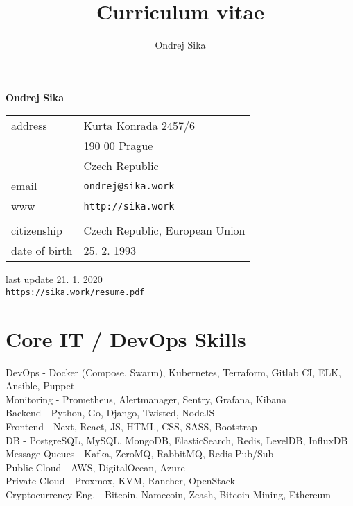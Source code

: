\documentclass[12pt,a4paper]{article}
\title{Curriculum vitae}
\author{Ondrej Sika}
\begin{document}
\begin{center}
{\LARGE \bf Ondrej Sika}\\
\vspace*{0.2cm}
\begin{tabular}{R{7cm}L{7cm}}
address & Kurta Konrada 2457/6\\
 & 190 00 Prague\\
 & Czech Republic\\
email & \texttt{ondrej@sika.work}\\
www & \texttt{http://sika.work}\\
\\
citizenship & Czech Republic, European Union\\
date of birth & 25. 2. 1993\\
\end{tabular}

\vspace*{0.3cm}
{\hfill last update 21. 1. 2020}\\
{\hfill \texttt{https://sika.work/resume.pdf}}
\end{center}

\section*{Core IT / DevOps Skills}
DevOps - Docker (Compose, Swarm), Kubernetes, Terraform, Gitlab CI, ELK, Ansible, Puppet\\
Monitoring - Prometheus, Alertmanager, Sentry, Grafana, Kibana\\
Backend - Python, Go, Django, Twisted, NodeJS\\
Frontend - Next, React, JS, HTML, CSS, SASS, Bootstrap\\
DB - PostgreSQL, MySQL, MongoDB, ElasticSearch, Redis, LevelDB, InfluxDB\\
Message Queues - Kafka, ZeroMQ, RabbitMQ, Redis Pub/Sub\\
Public Cloud - AWS, DigitalOcean, Azure\\
Private Cloud - Proxmox, KVM, Rancher, OpenStack\\
Cryptocurrency Eng. - Bitcoin, Namecoin, Zcash, Bitcoin Mining, Ethereum\\
\end{document}
